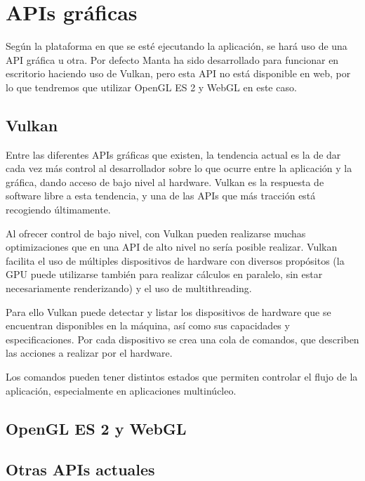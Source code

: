 \section{APIs gráficas}
\label{APIS}

Según la plataforma en que se esté ejecutando la aplicación, se hará uso de una API gráfica u otra. Por defecto Manta ha sido desarrollado para funcionar en escritorio haciendo uso de Vulkan, pero esta API no está disponible en web, por lo que tendremos que utilizar OpenGL ES 2 y WebGL en este caso.

\subsection{Vulkan}
Entre las diferentes APIs gráficas que existen, la tendencia actual es la de dar cada vez más control al desarrollador sobre lo que ocurre entre la aplicación y la gráfica, dando acceso de bajo nivel al hardware. Vulkan es la respuesta de software libre a esta tendencia, y una de las APIs que más tracción está recogiendo últimamente.

Al ofrecer control de bajo nivel, con Vulkan pueden realizarse muchas optimizaciones que en una API de alto nivel no sería posible realizar. Vulkan facilita el uso de múltiples dispositivos de hardware con diversos propósitos (la GPU puede utilizarse también para realizar cálculos en paralelo, sin estar necesariamente renderizando) y el uso de multithreading.

Para ello Vulkan puede detectar y listar los dispositivos de hardware que se encuentran disponibles en la máquina, así como sus capacidades y especificaciones. Por cada dispositivo se crea una cola de comandos, que describen las acciones a realizar por el hardware.

Los comandos pueden tener distintos estados que permiten controlar el flujo de la aplicación, especialmente en aplicaciones multinúcleo.

\subsection{OpenGL ES 2 y WebGL}

\subsection{Otras APIs actuales}